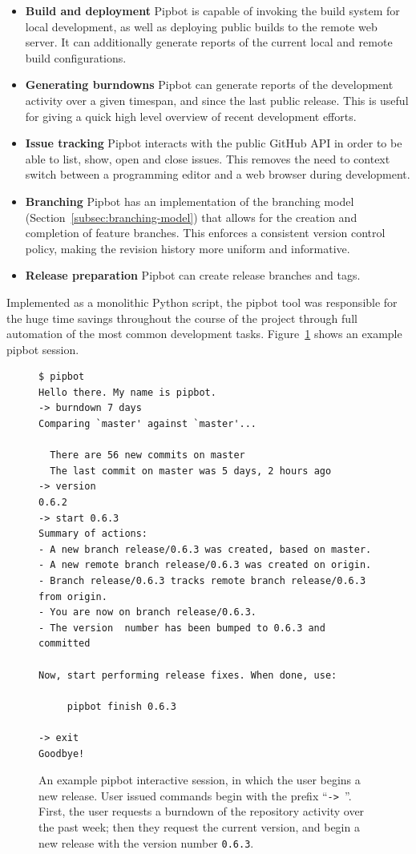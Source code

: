 \begin{itemize}
\item \textbf{Build and deployment} Pipbot is capable of invoking the
  build system for local development, as well as deploying public
  builds to the remote web server. It can additionally generate
  reports of the current local and remote build configurations.
\item \textbf{Generating burndowns} Pipbot can generate reports of the
  development activity over a given timespan, and since the last
  public release. This is useful for giving a quick high level
  overview of recent development efforts.
\item \textbf{Issue tracking} Pipbot interacts with the public GitHub
  API in order to be able to list, show, open and close issues. This
  removes the need to context switch between a programming editor and
  a web browser during development.
\item \textbf{Branching} Pipbot has an implementation of the branching
  model (Section~\ref{subsec:branching-model}) that allows for the
  creation and completion of feature branches. This enforces a
  consistent version control policy, making the revision history more
  uniform and informative.
\item \textbf{Release preparation} Pipbot can create release branches
  and tags.
\end{itemize}

\newpage
Implemented as a monolithic Python script, the pipbot tool was
responsible for the huge time savings throughout the course of the
project through full automation of the most common development
tasks. Figure~\ref{fig:pipbot-session} shows an example pipbot
session.

\br{}


\begin{figure}[H]
\begin{verbatim}
$ pipbot
Hello there. My name is pipbot.
-> burndown 7 days
Comparing `master' against `master'...

  There are 56 new commits on master
  The last commit on master was 5 days, 2 hours ago
-> version
0.6.2
-> start 0.6.3
Summary of actions:
- A new branch release/0.6.3 was created, based on master.
- A new remote branch release/0.6.3 was created on origin.
- Branch release/0.6.3 tracks remote branch release/0.6.3 from origin.
- You are now on branch release/0.6.3.
- The version  number has been bumped to 0.6.3 and committed

Now, start performing release fixes. When done, use:

     pipbot finish 0.6.3

-> exit
Goodbye!
\end{verbatim}
\caption[Example pipbot session]
  {An example pipbot interactive session, in which the user begins a
   new release. User issued commands begin with the prefix
   ``\texttt{-> }''. First, the user requests a burndown of the
   repository activity over the past week; then they request the
   current version, and begin a new release with the version number
   \texttt{0.6.3}.}
\label{fig:pipbot-session}
\end{figure}
